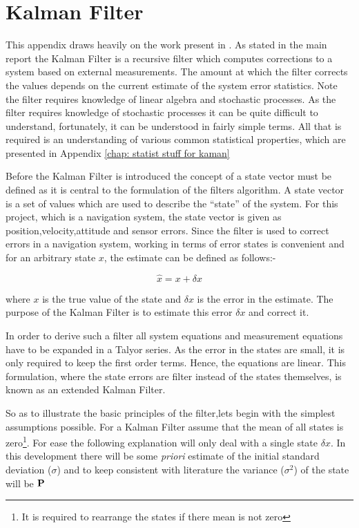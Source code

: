 \chapter{Kalman Filter}
This appendix draws heavily on the work present in \cite{bin}. As stated in the main report the Kalman Filter is a recursive filter which computes corrections to a system based on external measurements. The amount at which the filter corrects the values depends on the current estimate of the system error statistics. Note the filter requires knowledge of linear algebra and stochastic processes. As the filter requires knowledge of stochastic processes it can be quite difficult to understand, fortunately, it can be understood in fairly simple terms. All that is required is an understanding of various common statistical properties, which are presented in Appendix \ref{chap: statist stuff for kaman}

Before the Kalman Filter is introduced the concept of a state vector must be defined as it is central to the formulation of the filters algorithm. A state vector is a set of values which are used to describe the \enquote{state} of the system. For this project, which is a navigation system, the state vector is given as position,velocity,attitude and sensor errors. Since the filter is used to correct errors in a navigation system, working in terms of error states is convenient and for an arbitrary state $x$, the estimate can be defined as follows:-   

\begin{equation}
\hat{x} = x + \delta x
\end{equation} 

where $x$ is the true value of the state and $\delta x$ is the error in the estimate. The purpose of the Kalman Filter is to estimate this error $\delta x$ and correct it.

In order to derive such a filter all system equations and measurement equations have to be expanded in a Talyor series. As the error in the states are small, it is only required to keep the first order terms. Hence, the equations are linear. This formulation, where the state errors are filter instead of the states themselves, is known as an extended Kalman Filter.

So as to illustrate the basic principles of the filter,lets begin with the simplest assumptions possible. For a Kalman Filter assume that the mean of all states is zero\footnote{It is required to rearrange the states if there mean is not zero}. For ease the following explanation will only deal with a single state $\delta x$. In this development there will be some \textit{priori} estimate of the initial standard deviation ($\sigma$) and to keep consistent with literature the variance ($\sigma^2$) of the state will be $\bf P$ 

